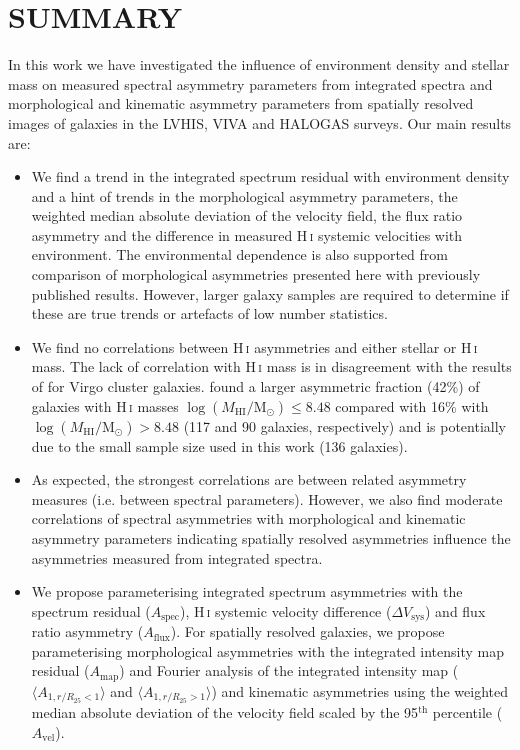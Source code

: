\documentclass[fleqn,usenatbib]{mnras}
\begin{document}
\section{SUMMARY}
\label{sec:conclusion}

In this work we have investigated the influence of environment density and stellar mass on measured spectral asymmetry parameters from integrated spectra and morphological and kinematic asymmetry parameters from spatially resolved images of galaxies in the LVHIS, VIVA and HALOGAS surveys. Our main results are:
\begin{itemize}
    \item We find a trend in the integrated spectrum residual with environment density and a hint of trends in the morphological asymmetry parameters, the weighted median absolute deviation of the velocity field, the flux ratio asymmetry and the difference in measured H\,\textsc{i} systemic velocities with environment. The environmental dependence is also supported from comparison of morphological asymmetries presented here with previously published results. However, larger galaxy samples are required to determine if these are true trends or artefacts of low number statistics.
    
    \item We find no correlations between H\,\textsc{i} asymmetries and either stellar or H\,\textsc{i} mass. The lack of correlation with H\,\textsc{i} mass is in disagreement with the results of \cite{Scott2018} for Virgo cluster galaxies. \cite{Scott2018} found a larger asymmetric fraction (42\%) of galaxies with H\,\textsc{i} masses $\log(M_{\mathrm{HI}}/\mathrm{M}_{\odot})\leq8.48$ compared with 16\% with $\log(M_{\mathrm{HI}}/\mathrm{M}_{\odot})>8.48$ (117 and 90 galaxies, respectively) and is potentially due to the small sample size used in this work (136 galaxies).
    
    \item As expected, the strongest correlations are between related asymmetry measures (i.e. between spectral parameters). However, we also find moderate correlations of spectral asymmetries with morphological and kinematic asymmetry parameters indicating spatially resolved asymmetries influence the asymmetries measured from integrated spectra.
    
    \item We propose parameterising integrated spectrum asymmetries with the spectrum residual ($A_{\mathrm{spec}}$), H\,\textsc{i} systemic velocity difference ($\Delta V_{\mathrm{sys}}$) and flux ratio asymmetry ($A_{\mathrm{flux}}$). For spatially resolved galaxies, we propose parameterising morphological asymmetries with the integrated intensity map residual ($A_{\mathrm{map}}$) and Fourier analysis of the integrated intensity map ($\langle A_{1,r/R_{25}<1} \rangle$ and $\langle A_{1,r/R_{25}>1} \rangle$) and kinematic asymmetries using the weighted median absolute deviation of the velocity field scaled by the 95$^{\mathrm{th}}$ percentile ($A_{\mathrm{vel}}$).
    

\end{itemize}
\end{document}
